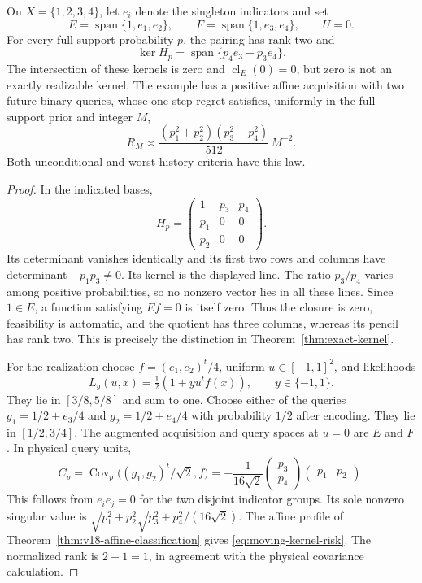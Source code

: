 \begin{proposition}
\label{prop:square-moving-kernel}
On $X=\{1,2,3,4\}$, let $e_i$ denote the singleton indicators and set
\[
 E=\operatorname{span}\{1,e_1,e_2\},\qquad
 F=\operatorname{span}\{1,e_3,e_4\},\qquad U=0.
\]
For every full-support probability $p$, the pairing has rank two and
\[
 \ker H_p=\operatorname{span}\{p_4e_3-p_3e_4\}.
\]
The intersection of these kernels is zero and $\operatorname{cl}_E(0)=0$,
but zero is not an exactly realizable kernel. The example has a positive
affine acquisition with two future binary queries, whose one-step
regret satisfies, uniformly in the full-support prior and integer $M$,
\begin{equation}\label{eq:moving-kernel-risk}
 R_M\asymp
 \frac{(p_1^2+p_2^2)(p_3^2+p_4^2)}{512}\,M^{-2}.
\end{equation}
Both unconditional and worst-history criteria have this law.
\end{proposition}
\begin{proof}
In the indicated bases,
\[
 H_p=\begin{pmatrix}1&p_3&p_4\\p_1&0&0\\p_2&0&0\end{pmatrix}.
\]
Its determinant vanishes identically and its first two rows and columns
have determinant $-p_1p_3\ne0$. Its kernel is the displayed line.
The ratio $p_3/p_4$ varies among positive probabilities, so no nonzero
vector lies in all these lines. Since $1\in E$, a function satisfying
$Ef=0$ is itself zero. Thus the closure is zero, feasibility is automatic,
and the quotient has three columns, whereas its pencil has rank two.
This is precisely the distinction in Theorem~\ref{thm:exact-kernel}.

For the realization choose $f=(e_1,e_2)^t/4$, uniform
$u\in[-1,1]^2$, and likelihoods
\[
 L_y(u,x)=\tfrac12(1+y u^tf(x)),\qquad y\in\{-1,1\}.
\]
They lie in $[3/8,5/8]$ and sum to one. Choose either of the queries
$g_1=1/2+e_3/4$ and $g_2=1/2+e_4/4$ with probability $1/2$
after encoding. They lie in $[1/2,3/4]$. The augmented acquisition
and query spaces at $u=0$ are $E$ and $F$. In physical query units,
\[
 C_p=\operatorname{Cov}_p\bigl((g_1,g_2)^t/\sqrt2,f\bigr)
 =-\frac1{16\sqrt2}
       \begin{pmatrix}p_3\\p_4\end{pmatrix}
       \begin{pmatrix}p_1&p_2\end{pmatrix}.
\]
This follows from $e_i e_j=0$ for the two disjoint indicator groups.
Its sole nonzero singular value is
$\sqrt{p_1^2+p_2^2}\sqrt{p_3^2+p_4^2}/(16\sqrt2)$.
The affine profile of Theorem~\ref{thm:v18-affine-classification} gives
\eqref{eq:moving-kernel-risk}. The normalized rank is $2-1=1$,
in agreement with the physical covariance calculation.
\end{proof}

